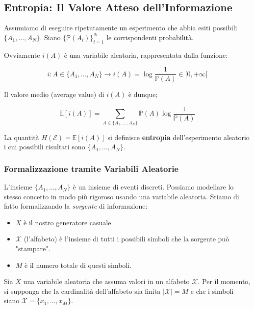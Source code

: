 \subsection{Entropia: Il Valore Atteso dell'Informazione}

Assumiamo di eseguire ripetutamente un esperimento che abbia esiti possibili $\{A_1, \dots, A_N\}$. 
Siano $\{\mathbb{P}(A_i)\}_{i=1}^N$ le corrispondenti probabilità.

Ovviamente $i(A)$ è una variabile aleatoria, rappresentata dalla funzione:

\begin{equation}
i : A \in \{A_1, \dots, A_N\} \longrightarrow i(A) = \log \frac{1}{\mathbb{P}(A)} \in [0, +\infty[
\end{equation}

Il valore medio (average value) di $i(A)$ è dunque;

\begin{equation}
\mathbb{E}[i(A)] = \sum_{A \in \{A_1, \dots, A_N\}} \mathbb{P}(A) \log \frac{1}{\mathbb{P}(A)}
\end{equation}

La quantità $H(\mathcal{E}) = \mathbb{E}[i(A)]$ si definisce \textbf{entropia} dell'esperimento aleatorio i cui possibili risultati sono $\{A_1, \dots, A_N\}$.

\vspace{0.5cm}

\subsubsection*{Formalizzazione tramite Variabili Aleatorie}

L'insieme $\{A_1, \dots, A_N\}$ è un insieme di eventi discreti. Possiamo modellare lo stesso concetto in modo più rigoroso usando una variabile aleatoria. Stiamo di fatto formalizzando la \textit{sorgente} di informazione:
\begin{itemize}
    \item $X$ è il nostro generatore casuale.
    \item $\mathcal{X}$ (l'alfabeto) è l'insieme di tutti i possibili simboli che la sorgente può "stampare".
    \item $M$ è il numero totale di questi simboli.
\end{itemize}

Sia $X$ una variabile aleatoria che assuma valori in un alfabeto $\mathcal{X}$. Per il momento, si supponga che la cardinalità dell'alfabeto sia finita $|\mathcal{X}| = M$ e che i simboli siano $\mathcal{X} = \{x_1, \dots, x_M\}$.

